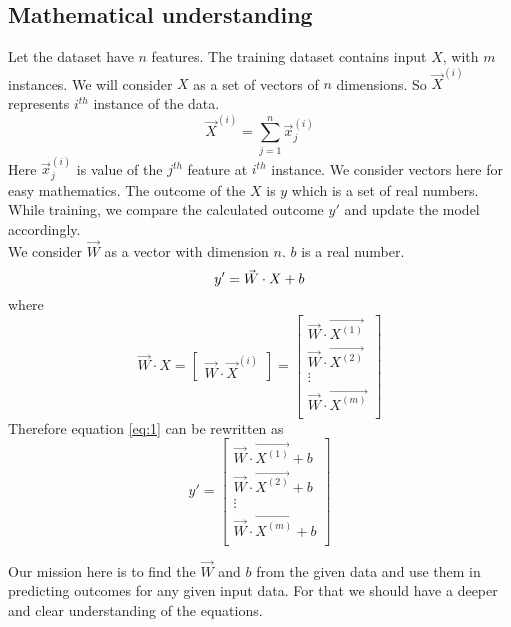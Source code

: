 \subsection{Mathematical understanding}
Let the dataset have $n$ features. The training dataset contains input $X$, with $m$ instances.
We will consider $X$ as a set of vectors of $n$ dimensions. So $\vec{X}^{(i)}$ represents $i^{th}$ instance of
the data.
\begin{equation}
    \vec{X}^{(i)} = \sum_{j=1}^{n} \vec{x}_{j}^{(i)}
\end{equation}
Here $\vec{x}_{j}^{(i)}$ is value of the $j^{th}$ feature at $i^{th}$ instance.
We consider vectors here for easy mathematics. The outcome of the $X$ is $y$ which is a set of real numbers. While training, we compare the calculated 
outcome $y'$ and update the model accordingly.\\

We consider $\vec{W}$ as a vector with dimension $n$. $b$ is a real number.
\begin{equation}
    y' = \vec{W} \cdot X + b \label{eq:1}\\
\end{equation}
where
\begin{equation}
    \vec{W} \cdot X = \begin{bmatrix}\vec{W} \cdot \vec{X}^{(i)} \end{bmatrix}
    = \begin{bmatrix}
        \vec{W} \cdot \vec{X^{(1)}} \\
        \vec{W} \cdot \vec{X^{(2)}} \\
        \vdots \\
        \vec{W} \cdot \vec{X^{(m)}} \\
    \end{bmatrix}
\end{equation}
Therefore equation \eqref{eq:1} can be rewritten as
\begin{equation}
    y' = \begin{bmatrix}
        \vec{W} \cdot \vec{X^{(1)}} + b \\
        \vec{W} \cdot \vec{X^{(2)}} + b \\
        \vdots \\
        \vec{W} \cdot \vec{X^{(m)}} + b \\
    \end{bmatrix}
\end{equation}

Our mission here is to find the $\vec{W}$ and $b$ from the given data and use them 
in predicting outcomes for any given input data. For that we should have a deeper and 
clear understanding of the equations.

